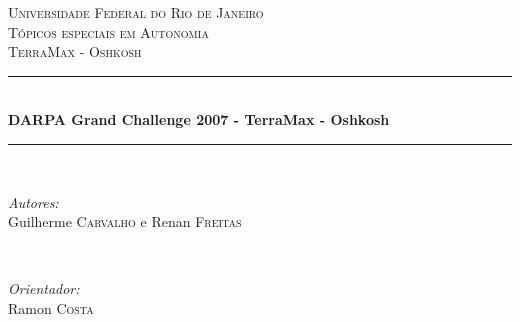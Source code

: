 \documentclass[12pt]{article}
\begin{document}
\begin{titlepage}

\newcommand{\HRule}{\rule{\linewidth}{0.5mm}} %

\center %
 

\textsc{\LARGE Universidade Federal do Rio de Janeiro}\\[1.5cm]
\textsc{\Large Tópicos especiais em Autonomia}\\[0.5cm] %
\textsc{\large TerraMax - Oshkosh}\\[0.5cm] %


\HRule \\[0.4cm]
{ \huge \bfseries DARPA Grand Challenge 2007 -  TerraMax - Oshkosh}\\[0.4cm] %
\HRule \\[1.5cm]
 

\begin{minipage}{0.4\textwidth}
\begin{flushleft} \large
\emph{Autores:}\\
Guilherme \textsc{Carvalho} e Renan \textsc{Freitas}
\end{flushleft}
\end{minipage}
~
\begin{minipage}{0.4\textwidth}
\begin{flushright} \large
\emph{Orientador:} \\
Ramon \textsc{Costa} 
\end{flushright}
\end{minipage}\\[2cm]



\end{titlepage}
\end{document}
